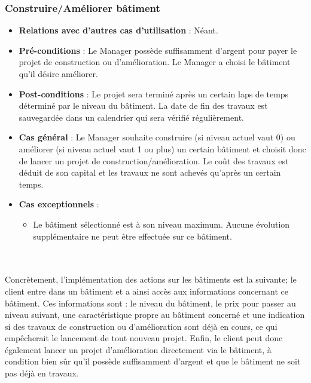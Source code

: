 \documentclass[a4paper,titlepage]{scrreprt}
\begin{document}
    \subsubsection{Construire/Améliorer bâtiment}
      \begin{itemize}
        \item \textbf{Relations avec d'autres cas d'utilisation}  : Néant.
        \item \textbf{Pré-conditions} : Le Manager possède suffisamment d’argent pour payer le projet de construction ou d’amélioration. Le Manager a choisi le bâtiment qu’il désire améliorer.
        \item \textbf{Post-conditions} : Le projet sera terminé après un certain laps de temps déterminé par le niveau du bâtiment. La date de fin des travaux est sauvegardée dans un \gls{calendrier} qui sera vérifié régulièrement.
        \item \textbf{Cas général} : Le Manager souhaite construire (si niveau actuel vaut 0) ou améliorer (si niveau actuel vaut 1 ou plus) un certain bâtiment et choisit donc de lancer un projet de construction/amélioration. Le coût des travaux est déduit de son capital et les travaux ne sont achevés qu'après un certain temps.
        \item \textbf{Cas exceptionnels} :
        \begin{itemize}
            \item Le bâtiment sélectionné est à son niveau maximum. Aucune évolution supplémentaire ne peut être effectuée sur ce bâtiment.
          \end{itemize}
      \end{itemize}

     \\
     \\
      Concrètement, l'implémentation des actions sur les bâtiments est la suivante; le client entre dans un bâtiment et a ainsi accès aux informations concernant ce bâtiment. Ces informations sont : le niveau du bâtiment, le prix pour passer au niveau suivant, une caractéristique propre au bâtiment concerné et une indication si des travaux de construction ou d'amélioration sont déjà en cours, ce qui empêcherait le lancement de tout nouveau projet. Enfin, le client peut donc également lancer un projet d'amélioration directement via le bâtiment, à condition bien sûr qu'il possède suffisamment d'argent et que le bâtiment ne soit pas déjà en travaux.
\end{document}
